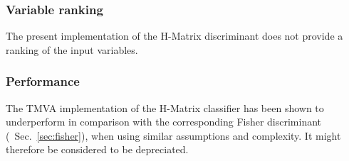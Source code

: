 \subsubsection{Variable ranking}

The present implementation of the H-Matrix discriminant does not provide a ranking 
of the input variables.

\subsubsection{Performance}

The TMVA implementation of the H-Matrix classifier has been shown to underperform 
in comparison with the corresponding Fisher discriminant (\cf\  Sec.~\ref{sec:fisher}),
when using similar assumptions and complexity. It might therefore be considered to be depreciated.

